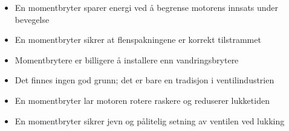 \begin{itemize}
\item{} En momentbryter sparer energi ved å begrense motorens innsats under bevegelse
\vskip 5pt 
\item{} En momentbryter sikrer at flenspakningene er korrekt tilstrammet
\vskip 5pt 
\item{} Momentbrytere er billigere å installere enn vandringsbrytere
\vskip 5pt 
\item{} Det finnes ingen god grunn; det er bare en tradisjon i ventilindustrien
\vskip 5pt 
\item{} En momentbryter lar motoren rotere raskere og reduserer lukketiden
\vskip 5pt 
\item{} En momentbryter sikrer jevn og pålitelig setning av ventilen ved lukking
\end{itemize}




